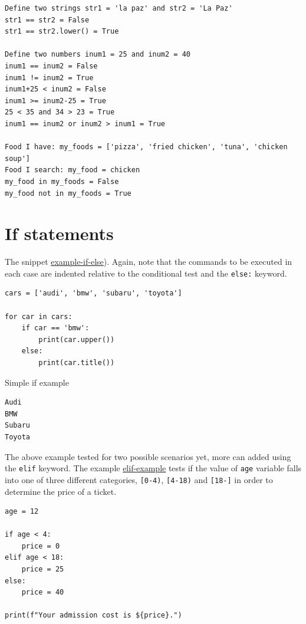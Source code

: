 \documentclass[10pt]{book}
\newenvironment{code}{\captionsetup{labelfont=bf, type=listing, name=Snippet, aboveskip=-3pt ,belowskip=15pt}}{}
\begin{document}
\begin{enumerate}
\label{orge628dbd}
\begin{verbatim}
Define two strings str1 = 'la paz' and str2 = 'La Paz'
str1 == str2 = False
str1 == str2.lower() = True

Define two numbers inum1 = 25 and inum2 = 40
inum1 == inum2 = False
inum1 != inum2 = True
inum1+25 < inum2 = False
inum1 >= inum2-25 = True
25 < 35 and 34 > 23 = True
inum1 == inum2 or inum2 > inum1 = True

Food I have: my_foods = ['pizza', 'fried chicken', 'tuna', 'chicken soup']
Food I search: my_food = chicken
my_food in my_foods = False
my_food not in my_foods = True
\end{verbatim}
\end{enumerate}
\section{If statements}
\label{sec:org7045634}
The snippet \hyperref[org9219348]{example-if-else}). Again, note that the commands to be executed in each case are indented relative to the conditional test and the \texttt{else:} keyword.

\label{org25083d6}
\begin{code}
\begin{verbatim}
cars = ['audi', 'bmw', 'subaru', 'toyota']

for car in cars:
    if car == 'bmw':
        print(car.upper())
    else:
        print(car.title())
\end{verbatim}
\caption{\label{lst:org1baa484}Simple if example}
\end{code}

\label{org9219348}
\begin{verbatim}
Audi
BMW
Subaru
Toyota
\end{verbatim}

The above example tested for two possible scenarios yet, more can added using the \texttt{elif} keyword. The example \hyperref[orga991237]{elif-example} tests if the value of \texttt{age} variable falls into one of three different categories, \texttt{[0-4)}, \texttt{[4-18)} and \texttt{[18-]} in order to determine the price of a ticket.

\label{org0a7b6d8}
\begin{verbatim}
age = 12

if age < 4:
    price = 0
elif age < 18:
    price = 25
else:
    price = 40

print(f"Your admission cost is ${price}.")
\end{verbatim}
\end{document}
